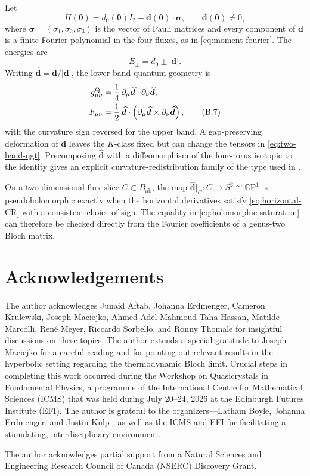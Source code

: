 \documentclass[11pt]{article}
\theoremstyle{definition}
\theoremstyle{remark}
\newcommand{\CC}{\mathbb C}
\begin{document}
Let
\[
        H(\bm\theta)=d_0(\bm\theta)I_2+
                     \bm d(\bm\theta)\cdot\bm\sigma,
        \qquad \bm d(\bm\theta)\neq0,
        \tag{B.5}\label{eq:two-band}
\]
where \(\bm\sigma=(\sigma_1,\sigma_2,\sigma_3)\) is the vector of Pauli
matrices and every component of \(\bm d\) is a finite Fourier polynomial in
the four fluxes, as in \eqref{eq:moment-fourier}.  The energies are
\[
                  E_\pm=d_0\pm|\bm d|.
                  \tag{B.6}\label{eq:two-band-energies}
\]
Writing \(\widehat{\bm d}=\bm d/|\bm d|\), the lower-band quantum geometry is
\begin{align}
 g_{\mu\nu}^{\mathrm Q}
   &=\frac14\,
     \partial_\mu\widehat{\bm d}\cdot
     \partial_\nu\widehat{\bm d},\notag\\
 F_{\mu\nu}
   &=\frac12\,
     \widehat{\bm d}\cdot
     \left(
       \partial_\mu\widehat{\bm d}\times
       \partial_\nu\widehat{\bm d}
     \right),
     \tag{B.7}\label{eq:two-band-qgt}
\end{align}
with the curvature sign reversed for the upper band.  A gap-preserving
deformation of \(\bm d\) leaves the \(K\)-class fixed but can change the
tensors in \eqref{eq:two-band-qgt}.  Precomposing
\(\widehat{\bm d}\) with a
diffeomorphism of the four-torus isotopic to the identity gives an explicit
curvature-redistribution family of the type used in
.

On a two-dimensional flux slice \(C\subset B_{\mathrm{ab}}\), the map
\(\widehat{\bm d}|_C:C\to S^2\cong\CC\mathrm P^1\) is
pseudoholomorphic exactly when the horizontal derivatives satisfy
\eqref{eq:horizontal-CR} with a consistent choice of sign.  The equality in
\eqref{eq:holomorphic-saturation} can therefore be checked directly from the
Fourier coefficients of a genus-two Bloch matrix.

\section*{Acknowledgements}

The author acknowledges Junaid Aftab, Johanna Erdmenger, Cameron Krulewski,
Joseph Maciejko, Ahmed Adel Mahmoud Taha Hassan, Matilde Marcolli, Ren\'e
Meyer, Riccardo Sorbello, and Ronny Thomale for insightful discussions on
these topics. The author extends a special gratitude
to Joseph Maciejko for a careful reading and for pointing out relevant results
in the hyperbolic setting regarding the thermodynamic Bloch limit. Crucial
steps in completing this work occurred during the Workshop on Quasicrystals
in Fundamental Physics, a programme of the International Centre for
Mathematical Sciences (ICMS) that was held during July 20--24, 2026 at the
Edinburgh Futures Institute (EFI).
The author is grateful to the organizers---Latham Boyle, Johanna Erdmenger,
and Justin Kulp---as well as the ICMS and EFI for facilitating a stimulating,
interdisciplinary environment.

The author acknowledges partial support from a Natural Sciences and
Engineering Research Council of Canada (NSERC) Discovery Grant.

\begingroup
\small


\endgroup
\end{document}
